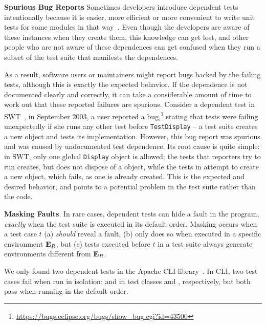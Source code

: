 \vspace{1mm}

\noindent \textbf{Spurious Bug Reports}
Sometimes developers introduce dependent tests intentionally because it is
easier, more efficient or more convenient to write unit tests for some modules
in that way~\cite{kapfhammeretal:FSE:2003, whittakeretal:2012}.
Even though the developers are aware of these instances
when they create them, this knowledge can get lost, 
and other people who are not aware of these dependences can get confused 
when they run a subset of the test suite that manifests the
dependences.

As a result, software users or maintainers
might report bugs backed by the failing tests, although this
is exactly the expected behavior. 
If the dependence is not documented clearly and
correctly, it can take a considerable amount of time to work out that
these reported failures are spurious.
Consider a dependent test in SWT~\cite{swt},
in September 2003, a user reported a
bug,\footnote{\url{https://bugs.eclipse.org/bugs/show_bug.cgi?id=43500}}
stating that tests were failing unexpectedly
if she runs any other test before \texttt{TestDisplay} --
a test suite creates a new  object and tests its
implementation. However, this bug report was spurious and was
caused by undocumented test dependence.
Its root cause is quite simple: in SWT, only one global \texttt{Display}
object is allowed; the tests that reporters try to run
creates, but does not dispose of a  object, while
the tests in  attempt to create
a new  object, which fails, as one
is already created. This is the expected and desired behavior,
and points to a potential problem in the test suite rather
than the code.

\vspace{1mm}

\noindent \textbf{Masking Faults}. In rare cases,
dependent tests can hide a fault in the
program, \emph{exactly} when the test suite is executed in its default
order. Masking occurs when a test case $t$ (a) \emph{should}
reveal a fault, (b) only does so when executed in a specific environment
$\mathbf{E}_R$, but (c) tests executed before $t$ in a test suite always
generate environments different from
$\mathbf{E}_R$.



We only found two dependent tests in
the Apache CLI library~\cite{cli}.
In CLI, two test cases fail when run in isolation:
 and  in test
classes  and ,
respectively, but both pass when running in the default order.

